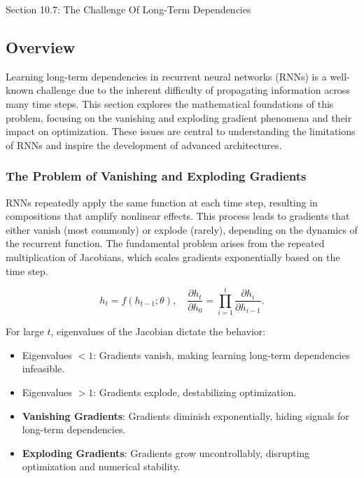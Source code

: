 \begin{notes}{Section 10.7: The Challenge Of Long-Term Dependencies}
    \subsection*{Overview}

    Learning long-term dependencies in recurrent neural networks (RNNs) is a well-known challenge due to the inherent difficulty of propagating information across many time steps. This section explores 
    the mathematical foundations of this problem, focusing on the vanishing and exploding gradient phenomena and their impact on optimization. These issues are central to understanding the limitations of 
    RNNs and inspire the development of advanced architectures.
    
    \subsubsection*{The Problem of Vanishing and Exploding Gradients}
    
    RNNs repeatedly apply the same function at each time step, resulting in compositions that amplify nonlinear effects. This process leads to gradients that either vanish (most commonly) or explode (rarely), 
    depending on the dynamics of the recurrent function. The fundamental problem arises from the repeated multiplication of Jacobians, which scales gradients exponentially based on the time step.
    
    \[
    h_t = f(h_{t-1}; \theta), \quad \frac{\partial h_t}{\partial h_0} = \prod_{i=1}^t \frac{\partial h_i}{\partial h_{i-1}}.
    \]
    
    For large $t$, eigenvalues of the Jacobian dictate the behavior:
    \begin{itemize}
        \item Eigenvalues $< 1$: Gradients vanish, making learning long-term dependencies infeasible.
        \item Eigenvalues $> 1$: Gradients explode, destabilizing optimization.
    \end{itemize}
    
    \begin{highlight}
        \begin{itemize}
            \item \textbf{Vanishing Gradients}: Gradients diminish exponentially, hiding signals for long-term dependencies.
            \item \textbf{Exploding Gradients}: Gradients grow uncontrollably, disrupting optimization and numerical stability.
        \end{itemize}
    \end{highlight}
    

\end{notes}
